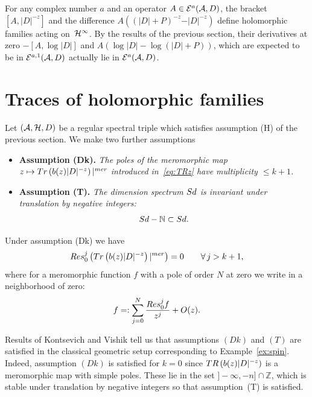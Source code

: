 \documentclass[11pt]{article}
\def \Z {\mathbb Z}
\def \N {\mathbb N}
\numberwithin{equation}{section}
\begin{document}
{\sloppy
\begin{example}\label{ex:differencelog}  For any complex number $a$ and an  operator $A\in {\cal E}^a({\cal A}, D)$,  the bracket $[A, \vert D\vert^{-z}]$ and
 the dif\/ference
 $A  \left((\vert D\vert +P)^{-z}-\vert D\vert^{-z }\right)$
  def\/ine holomorphic families acting on~${\cal H}^\infty$.
  By the results of the previous section, their derivatives at zero
   $-[A,\log \vert D\vert]$ and
   $A  \left(\log \vert D\vert -\log \left(\vert D\vert +P\right)\right)$, which are
    expected to be in $ {\cal E}^{a,1}({\cal A}, D)$ actually lie in
    $ {\cal E}^{a}({\cal A}, D)$.
\end{example}

}

\section{Traces of holomorphic families}\label{section5}

Let $\left({\cal A}, {\cal H}, D\right)$ be a regular spectral triple which
satisf\/ies assumption (H)  of the previous section. We  make two  further
assumptions\begin{itemize}
\item\itemsep=0pt
{\bf Assumption (Dk).} {\it  The poles of the meromorphic map $z\mapsto  {\rm Tr}\left(b(z) \vert
    D\vert^{-z}\right)\vert^{\rm mer} $ introduced in~\eqref{eq:TRz}
have  multiplicity $\leq  k+1$.}
\item {\bf Assumption (T).} {\it  The dimension spectrum ${\rm Sd}$ is
    invariant under translation by negative integers:}
    \[
    {\rm Sd}-\N \subset {\rm Sd}.
\]
\end{itemize}

\begin{remark} Under assumption (Dk) we have
\[
{\rm Res}^j_0 \left(  {\rm Tr}\left(b(z) \vert
    D\vert^{-z}\right)\vert^{\rm mer}\right)= 0\qquad \forall\, j> k+1,
\]
 where for
    a meromorphic function $f$ with a pole of order $N$ at zero we write in a
    neighborhood of zero:
\[
f=:\sum_{j=0}^N  \frac{{\rm Res}_0^j f}{z^j}+ O(z).
\]
\end{remark}

\begin{example} Results of Kontsevich and Vishik \cite{KV} tell us that assumptions $(Dk)$ and
  $(T)$ are satisf\/ied in the classical geometric setup   corresponding to
    Example~\ref{ex:spin}. Indeed, assumption  $(Dk)$  is satisf\/ied for $k=0$ since ${\rm
    TR}\left(b(z)  \vert D\vert^{-z}\right)$ is a meromorphic map
  with simple poles. These lie  in the set $]{-}\infty , -n]\cap
  \Z$, which is stable under translation by negative integers so that
  assumption~(T) is satisf\/ied.
\end{example}
\end{document}
